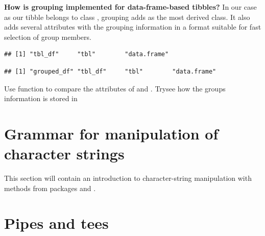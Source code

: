\documentclass[krantz2,ChapterTOCs]{krantz}\usepackage{knitr}
\begin{document}
\begin{explainbox}
\textbf{How is grouping implemented for data-frame-based tibbles?} In our case as our tibble belongs to class , grouping adds  as the most derived class. It also adds several attributes with the grouping information in a format suitable for fast selection of group members.

\begin{knitrout}\footnotesize
{}\color{fgcolor}\begin{kframe}
\begin{alltt}
 \hlkwb{<-} \hlstd{(} \hlstd{=} \hlopt{:}\hlstd{,}  \hlstd{=} \hlstd{(letters[}\hlopt{:}\hlstd{],} \hlstd{))}
\end{alltt}
\begin{verbatim}
## [1] "tbl_df"     "tbl"        "data.frame"
\end{verbatim}
\begin{alltt}
 \hlkwb{<-} 
\end{alltt}
\begin{verbatim}
## [1] "grouped_df" "tbl_df"     "tbl"        "data.frame"
\end{verbatim}
\end{kframe}
\end{knitrout}

\begin{playground}
Use function  to compare the attributes of   and . Trysee how the groups information is stored in
\end{playground}
\end{explainbox}

\section{Grammar for manipulation of character strings}\label{sec:data:strings}

\begin{warningbox}
  This section will contain an introduction to character-string manipulation with methods from packages  and .
\end{warningbox}

\section{Pipes and tees}\label{sec:data:pipes}
\end{document}
